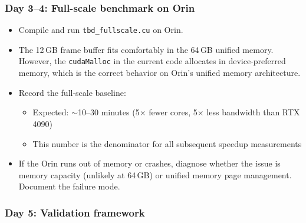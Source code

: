 \documentclass[11pt,letterpaper]{article}
\begin{document}
\subsubsection{Day 3--4: Full-scale benchmark on Orin}

\begin{itemize}[leftmargin=2em]
    \item Compile and run \texttt{tbd\_fullscale.cu} on Orin.
    \item The 12\,GB frame buffer fits comfortably in the 64\,GB unified
    memory. However, the \texttt{cudaMalloc} in the current code allocates
    in device-preferred memory, which is the correct behavior on Orin's
    unified memory architecture.

    \item Record the full-scale baseline:
    \begin{itemize}
        \item Expected: $\sim$10--30 minutes (5$\times$ fewer cores,
            5$\times$ less bandwidth than RTX 4090)
        \item This number is the denominator for all subsequent speedup
            measurements
    \end{itemize}

    \item If the Orin runs out of memory or crashes, diagnose whether the
    issue is memory capacity (unlikely at 64\,GB) or unified memory page
    management. Document the failure mode.
\end{itemize}

\subsubsection{Day 5: Validation framework}
\end{document}
